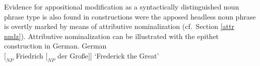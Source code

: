 Evidence for appositional modification as a syntactically distinguished noun phrase type is also found in constructions were the apposed headless noun phrase is overtly marked by means of attributive nominalization (cf.~Section \ref{attr nmlz}). Attributive nominalization can be illustrated with the epithet construction in German.
\ea 
{\rm German}\\
$[_{NP}$ Friedrich $[_{NP}$ der Gro{ß}e$] ]$ ‘Frederick the Great’
\z

